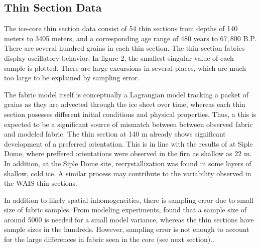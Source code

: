 \documentclass[TC, hvmath, online]{copernicus}
\begin{document}
{\subsection{Thin Section Data}
The ice-core thin section data consist of 54 thin sections from depths of 140 meters to 3405 meters, and a corresponding age range of 480 years to $67,800$ B.P. There are several hundred grains in each thin section. The thin-section fabrics display oscillatory behavior. In figure 2, the smallest singular value of each sample is plotted. There are large excursions in several places, which are much too large to be explained by sampling error. 

The fabric model itself is conceptually a Lagrangian model tracking a packet of grains as they are advected through the ice sheet over time, whereas each thin section posesses different initial conditions and physical properties. Thus, a this is expected to be a significant source of mismatch between between observed fabric and modeled fabric. The thin section at 140 m already shows significant development of a preferred orientation. This is in line with the results of \citet{diprinzio2005} at Siple Dome, where preffered orientations were observed in the firn as shallow as 22 m. In addition, at the Siple Dome site, recrystallization was found in some layers of shallow, cold ice. A similar process may contribute to the variability observed in the WAIS thin sections.

 In addition to likely spatial inhomogeneities, there is sampling error due to small size of fabric samples. From modeling experiments, \citet{thorsteinsson2002nni} found that a sample size of around 5000 is needed for a small model variance, whereas the thin sections have sample sizes in the hundreds. However, sampling error is not enough to account for the large differences in fabric seen in the core (see next section)..    

}
\end{document}
